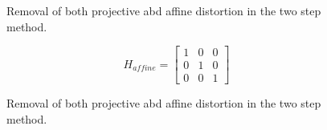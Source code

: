 \documentclass{article}
\begin{document}
\begin{figure}[!htbp]
     \centering
    \captionsetup[subfigure]{labelformat=empty}
    \caption{Removal of both projective abd affine distortion in the two step method.}
    \label{fig:2_step_2(1)}
\end{figure}
\begin{equation*}
	H_{affine} = \begin{bmatrix}
	1 & 0 & 0\\ 0 & 1 & 0\\0&0 & 1
	\end{bmatrix}
\end{equation*}
\begin{figure}[!htbp]
     \centering
    \captionsetup[subfigure]{labelformat=empty}
    \caption{Removal of both projective abd affine distortion in the two step method.}
    \label{fig:2_step_2(2)}
\end{figure}


\newpage
\end{document}
